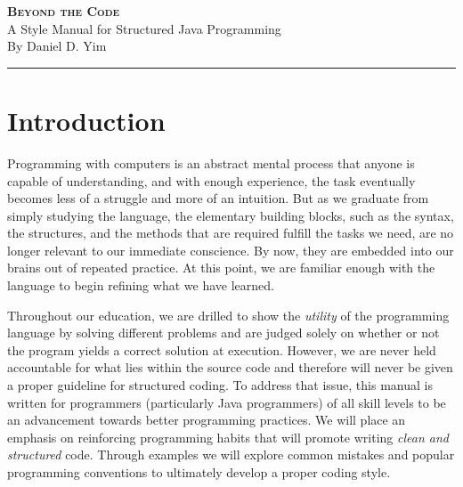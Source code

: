 \documentclass[11pt,oneside]{article}
\newcommand{\articleTitle}{Beyond the Code}
\newcommand{\subtitle}{A Style Manual for Structured Java Programming}
\newcommand{\articleAuthor}{By Daniel D. Yim}
\newcommand{\contact}{for Stephen F. Austin State University}
\newcommand{\header}[4]{
	\begin{center}
        {\fontsize{32pt}{10pt}\selectfont\scshape\bf#1}\\
        \vspace{0.6ex}
        {\fontsize{14pt}{10pt}\selectfont#2}\\
        \vspace{2.0ex}
        #3\\
    \end{center}
    \vspace{2.0ex}
}
\newenvironment{articleSectionN}[1]
{#1}
{}
\begin{document}
\selectfont

\header{\articleTitle}{\subtitle}{\articleAuthor}{\contact}
\hrule
\vspace{3.0ex}


\section*{Introduction}
\begin{articleSectionN}
\qquad Programming with computers is an abstract mental process that anyone is capable of understanding, and with enough experience, the task eventually becomes less of a struggle and more of an intuition. But as we graduate from simply studying the language, the elementary building blocks, such as the syntax, the structures, and the methods that are required fulfill the tasks we need, are no longer relevant to our immediate conscience. By now, they are embedded into our brains out of repeated practice. At this point, we are familiar enough with the language to begin refining what we have learned.

Throughout our education, we are drilled to show the \emph{utility} of the programming language by solving different problems and are judged solely on whether or not the program yields a correct solution at execution. However, we are never held accountable for what lies within the source code and therefore will never be given a proper guideline for structured coding. To address that issue, this manual is written for programmers (particularly Java programmers) of all skill levels to be an advancement towards better programming practices. We will place an emphasis on reinforcing programming habits that will promote writing \emph{clean and structured} code. Through examples we will explore common mistakes and popular programming conventions to ultimately develop a proper coding style.

\vspace{4pt}
\end{articleSectionN}
\end{document}
